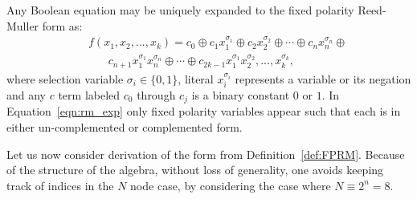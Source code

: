 \begin{definition}\label{def:FPRM}
Any Boolean equation may be uniquely expanded to the fixed polarity
Reed-Muller form as:\setlength{\arraycolsep}{0.140em}
\begin{eqnarray}\label{eqn:rm_exp}
&&f(x_1,x_2,...,x_k) = c_0\oplus c_1 x_1^{\sigma_1}\oplus c_2 x_2^{\sigma_2}\oplus
\cdots \oplus c_n x_n^{\sigma_n}\oplus\nonumber\\
&&~~~~~~~~c_{n+1}x_1^{\sigma_1} x_n^{\sigma_{n}}\oplus \cdots \oplus
c_{2k-1}x_1^{\sigma_1} x_2^{\sigma_2},...,x_k^{\sigma_k},
\end{eqnarray}
where selection variable $\sigma_i\in \{0,1\}$, literal
$x_i^{\sigma_i}$ represents a variable or its negation and any $c$
term labeled $c_0$ through $c_j$ is a binary constant $0$ or $1$. In
Equation~\eqref{eqn:rm_exp} only fixed polarity variables appear such that
each is in either un-complemented or complemented form.
\end{definition}

Let us now consider derivation of the form from Definition~\ref{def:FPRM}.  Because
of the structure of
the algebra, without loss of generality, one avoids keeping track of
indices in the $N$ node case, by considering the case where $N\equiv 2^n=8$.

